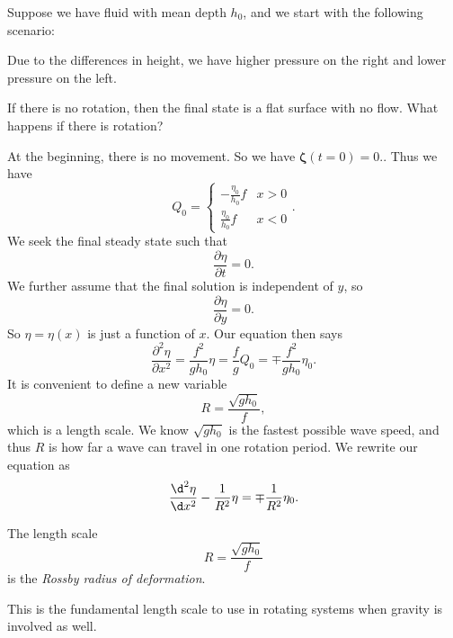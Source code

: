 \documentclass[a4paper]{article}
\begin{document}
\begin{eg}
  Suppose we have fluid with mean depth $h_0$, and we start with the following scenario:
  \begin{center}
  \end{center}
  Due to the differences in height, we have higher pressure on the right and lower pressure on the left.

  If there is no rotation, then the final state is a flat surface with no flow. What happens if there is rotation?

  At the beginning, there is no movement. So we have $\boldsymbol\zeta(t = 0) = 0$.. Thus we have
  \[
    Q_0 =
    \begin{cases}
      -\frac{\eta_0}{h_0}f & x > 0\\
      \frac{\eta_0}{h_0}f & x < 0
    \end{cases}.
  \]
  We seek the final steady state such that
  \[
    \frac{\partial \eta}{\partial t} = 0.
  \]
  We further assume that the final solution is independent of $y$, so
  \[
    \frac{\partial \eta}{\partial y} = 0.
  \]
  So $\eta = \eta(x)$ is just a function of $x$. Our equation then says
  \[
    \frac{\partial^2 \eta}{\partial x^2} = \frac{f^2}{gh_0} \eta = \frac{f}{g}Q_0 = \mp \frac{f^2}{gh_0}\eta_0.
  \]
  It is convenient to define a new variable
  \[
    R = \frac{\sqrt{gh_0}}{f},
  \]
  which is a length scale. We know $\sqrt{gh_0}$ is the fastest possible wave speed, and thus $R$ is how far a wave can travel in one rotation period. We rewrite our equation as
  \[
    \frac{\d^2 \eta}{\d x^2} - \frac{1}{R^2}\eta = \mp \frac{1}{R^2}\eta_0.
  \]
  \begin{defi}
    The length scale
    \[
      R = \frac{\sqrt{gh_0}}{f}
    \]
    is the \emph{Rossby radius of deformation}.
  \end{defi}
  This is the fundamental length scale to use in rotating systems when gravity is involved as well.


\end{eg}
\end{document}
